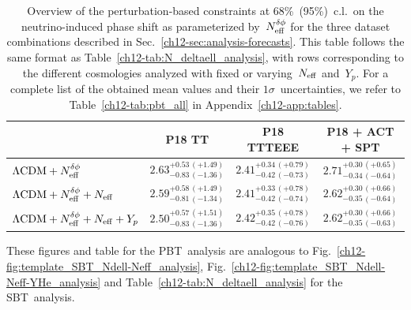 \begin{table}
	\centering
	\begin{tabular}{l c c c}
			\toprule
														& P18 TT										& P18 TTTEEE									& P18 + ACT + SPT								\\
			\midrule[0.065em]
		$\Lambda\mathrm{CDM} + N_\mathrm{eff}^{\delta\phi}$					& $2.63^{+0.53\, (+1.49)}_{-0.83\, (-1.36)}$	& $2.41^{+0.34\, (+0.79)}_{-0.42\, (-0.73)}$	& $2.71^{+0.30\, (+0.65)}_{-0.34\, (-0.64)}$	\\[4pt]
		$\Lambda\mathrm{CDM} + N_\mathrm{eff}^{\delta\phi} + N_\mathrm{eff}$ 		& $2.59^{+0.58\, (+1.49)}_{-0.81\, (-1.34)}$	& $2.41^{+0.33\, (+0.78)}_{-0.42\, (-0.74)}$	& $2.62^{+0.30\, (+0.66)}_{-0.35\, (-0.64)}$	\\[4pt]
		$\Lambda\mathrm{CDM} + N_\mathrm{eff}^{\delta\phi} + N_\mathrm{eff} + Y_p$	& $2.50^{+0.57\, (+1.51)}_{-0.83\, (-1.36)}$	& $2.42^{+0.35\, (+0.78)}_{-0.42\, (-0.76)}$	& $2.62^{+0.30\, (+0.66)}_{-0.35\, (-0.63)}$	\\[2pt]
			\bottomrule
	\end{tabular}
	\caption[Perturbation-based constraints on the neutrino-induced phase shift]{Overview of the perturbation-based constraints at 68\%~(95\%)~c.l.\ on the neutrino-induced phase shift as parameterized by~$N_\mathrm{eff}^{\delta\phi}$ for the three dataset combinations described in Sec.~\ref{ch12-sec:analysis-forecasts}. This table follows the same format as Table~\ref{ch12-tab:N_deltaell_analysis}, with rows corresponding to the different cosmologies analyzed with fixed or varying~$N_\mathrm{eff}$ and~$Y_p$. For a complete list of the obtained mean values and their $1\sigma$~uncertainties, we refer to Table~\ref{ch12-tab:pbt_all} in Appendix~\ref{ch12-app:tables}.}
	\label{ch12-tab:N_deltaphi_analysis}
\end{table}
These figures and table for the PBT~analysis are analogous to Fig.~\ref{ch12-fig:template_SBT_Ndell-Neff_analysis}, Fig.~\ref{ch12-fig:template_SBT_Ndell-Neff-YHe_analysis} and Table~\ref{ch12-tab:N_deltaell_analysis} for the SBT~analysis.\medskip

